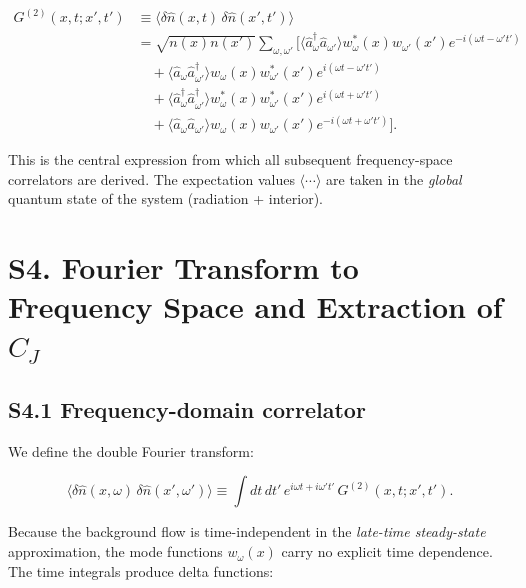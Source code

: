 \documentclass[prd,aps,showpacs,superscriptaddress,twocolumn]{revtex4-2}
\begin{document}
\begin{align}
G^{(2)}(x,t; x',t') &\equiv \langle \delta\hat{n}(x,t) \, \delta\hat{n}(x',t') \rangle \nonumber\\
&= \sqrt{n(x) n(x')} \sum_{\omega,\omega'} \Big[ \langle \hat{a}_\omega^\dagger \hat{a}_{\omega'} \rangle w_\omega^*(x) w_{\omega'}(x') e^{-i(\omega t - \omega' t')} \nonumber\\
&\quad + \langle \hat{a}_\omega \hat{a}_{\omega'}^\dagger \rangle w_\omega(x) w_{\omega'}^*(x') e^{i(\omega t - \omega' t')} \nonumber\\
&\quad + \langle \hat{a}_\omega^\dagger \hat{a}_{\omega'}^\dagger \rangle w_\omega^*(x) w_{\omega'}^*(x') e^{i(\omega t + \omega' t')} \nonumber\\
&\quad + \langle \hat{a}_\omega \hat{a}_{\omega'} \rangle w_\omega(x) w_{\omega'}(x') e^{-i(\omega t + \omega' t')} \Big].
\label{eq:G2_time}
\end{align}

This is the central expression from which all subsequent frequency-space correlators are derived. The expectation values $\langle \cdots \rangle$ are taken in the \emph{global} quantum state of the system (radiation + interior).

\section{S4. Fourier Transform to Frequency Space and Extraction of $C_J$}

\subsection{S4.1 Frequency-domain correlator}

We define the double Fourier transform:

\begin{equation}
\langle \delta\hat{n}(x,\omega) \, \delta\hat{n}(x',\omega') \rangle \equiv \int dt \, dt' \, e^{i\omega t + i\omega' t'} \, G^{(2)}(x,t; x',t').
\label{eq:FT_definition}
\end{equation}

Because the background flow is time-independent in the \emph{late-time steady-state} approximation, the mode functions $w_\omega(x)$ carry no explicit time dependence. The time integrals produce delta functions:
\end{document}
